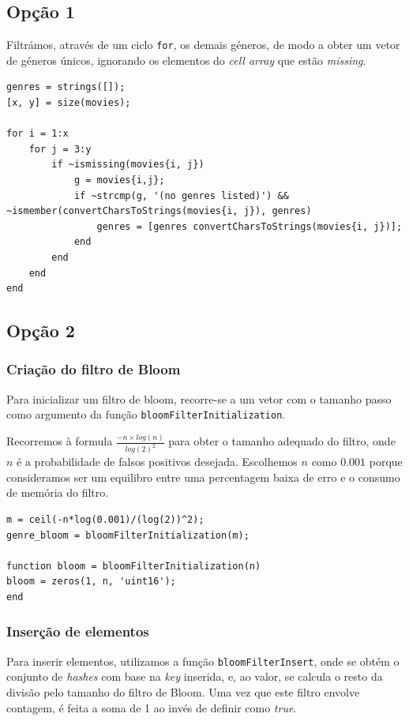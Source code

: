 \documentclass[portuguese, 11pt, a4paper,titlepage, oneside]{article}
\begin{document}
\subsection{Opção 1}
Filtrámos, através de um ciclo \verb|for|, os demais géneros, de modo a obter um vetor de géneros únicos, ignorando os elementos do \textit{cell array} que estão \textit{missing}.

\begin{lstlisting}[style=Matlab-editor]
genres = strings([]);
[x, y] = size(movies);

for i = 1:x
    for j = 3:y
        if ~ismissing(movies{i, j})
            g = movies{i,j};
            if ~strcmp(g, '(no genres listed)') && ~ismember(convertCharsToStrings(movies{i, j}), genres)
                genres = [genres convertCharsToStrings(movies{i, j})];
            end
        end
    end
end
\end{lstlisting}

\subsection{Opção 2}
\subsubsection{Criação do filtro de Bloom} \label{2_creation}
Para inicializar um filtro de bloom, recorre-se a um vetor com o tamanho passo como argumento da função \verb|bloomFilterInitialization|.

Recorremos à formula \(\frac{-n\times log(n)}{log(2)^2}\) para obter o tamanho adequado do filtro, onde \(n\) é a probabilidade de falsos positivos desejada. Escolhemos \(n\) como \(0.001\) porque consideramos ser um equilibro entre uma percentagem baixa de erro e o consumo de memória do filtro.

\begin{lstlisting}[style=Matlab-editor]
m = ceil(-n*log(0.001)/(log(2))^2);
genre_bloom = bloomFilterInitialization(m);

function bloom = bloomFilterInitialization(n)
bloom = zeros(1, n, 'uint16');
end
\end{lstlisting}

\subsubsection{Inserção de elementos} \label{2_insert}
Para inserir elementos, utilizamos a função \verb|bloomFilterInsert|, onde se obtém o conjunto de \textit{hashes} com base na \textit{key} inserida, e, ao valor, se calcula o resto da divisão pelo tamanho do filtro de Bloom. Uma vez que este filtro envolve contagem, é feita a soma de 1 ao invés de definir como \textit{true}.
\end{document}
